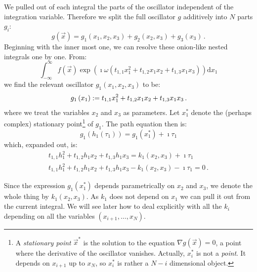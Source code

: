 \documentclass[a4paper,10pt]{article}
\begin{document}
We pulled out of each integral the parts of the oscillator
independent of the integration variable. Therefore we split
the full oscillator $g$ additively into $N$ parts $g_i$:
\begin{equation}
  g(\vec{x}) = g_1(x_1, x_2, x_3) + g_2(x_2, x_3) + g_3(x_3)\,.
\end{equation}
Beginning with the inner most one, we can resolve these onion-like
nested integrals one by one. From:
\begin{equation}
 \int_{-\infty}^{\infty} f\left(\vec{x}\right)
   \exp\left(\imath \omega \left(t_{1,1} x_1^2 + t_{1,2} x_1 x_2 + t_{1,3} x_1 x_3\right) \right)
 \mathrm{d}x_1
\end{equation}
we find the relevant oscillator $g_1(x_1, x_2, x_3)$ to be:
\begin{equation}
  g_1\left(x_1\right) := t_{1,1} x_1^2 + t_{1,2} x_1 x_2 + t_{1,3} x_1 x_3 \,.
\end{equation}
where we treat the variables $x_2$ and $x_3$ as parameters.
Let $x_1^*$ denote the (perhaps complex) stationary point\footnote{A
\emph{stationary point} $\vec{x}^{*}$ is the solution to the equation
$\nabla g(\vec{x}) = 0$, a point where the derivative of the oscillator vanishes.
Actually, $x_i^{*}$ is not a \emph{point}.
It depends on $x_{i+1}$ up to $x_N$, so $x_i^{*}$ is rather a $N-i$
dimensional object.} of $g_1$. The path equation then is:
\begin{equation}
  g_1\left(h_1(\tau_1)\right) = g_1\left(x_1^{*}\right) + \imath \tau_1
\end{equation}
which, expanded out, is:
\begin{gather}
  t_{1,1} h_1^2 + t_{1,2} h_1 x_2 + t_{1,3} h_1 x_3 = k_1(x_2, x_3) + \imath \tau_1 \\
  t_{1,1} h_1^2 + t_{1,2} h_1 x_2 + t_{1,3} h_1 x_3 - k_1(x_2, x_3) - \imath \tau_1 = 0 \,.
\end{gather}

Since the expression $g_1\left(x_1^{*}\right)$ depends parametrically on
$x_2$ and $x_3$, we denote the whole thing by $k_1\left(x_2, x_3\right)$.
As $k_1$ does not depend on $x_1$ we can pull it out from the
current integral. We will see later how to deal explicitly with
all the $k_i$ depending on all the variables $\left(x_{i+1}, \ldots ,x_N\right)$.
\end{document}

